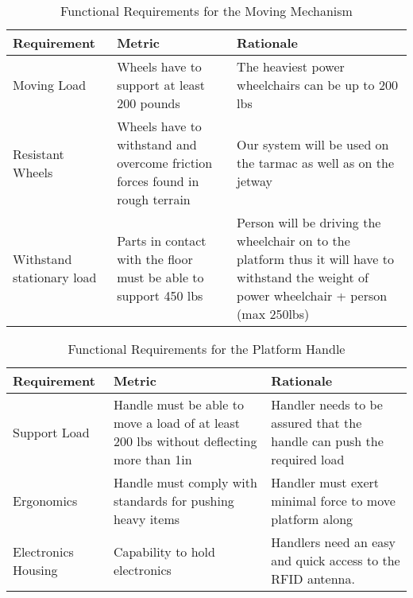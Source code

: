 \clearpage
\newpage

\begin{table}
\begin{tabular} {| p{4cm} | p{5cm} | p{5cm} |}
\hline
\textbf{Requirement} & \textbf{Metric} & \textbf{Rationale} \\ \hline

Moving Load &  Wheels have to support at least 200 pounds & The heaviest power wheelchairs can be up to 200 lbs \\ \hline
Resistant Wheels & Wheels have to withstand and overcome friction forces found in rough terrain &	Our system will be used on the tarmac as well as on the jetway \\ \hline
Withstand stationary load &	Parts in contact with the floor must be able to support 450 lbs	 & Person will be driving the wheelchair on to the platform thus it will have to withstand the weight of power wheelchair + person (max 250lbs) \\ \hline
\end{tabular} 
\caption{Functional Requirements for the Moving Mechanism}
\label{tab:functional_requirements_moving}
\end{table}

\begin{table}
\begin{tabular} {| p{4cm} | p{5cm} | p{5cm} |}
\hline
\textbf{Requirement} & \textbf{Metric} & \textbf{Rationale} \\ \hline

Support Load & Handle must be able to move a load of at least 200 lbs without deflecting more than 1in & Handler needs to be assured that the handle can push the required load  \\ \hline
Ergonomics & Handle must comply with standards for pushing heavy items & Handler must exert minimal force to move platform along  \\ \hline
Electronics Housing & Capability to hold electronics & Handlers need an easy and quick access to the RFID antenna.  \\ \hline
\end{tabular} 
\caption{Functional Requirements for the Platform Handle}
\label{tab:functional_requirements_handle}
\end{table}

\clearpage
\newpage

